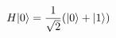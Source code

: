 \documentclass[preview]{standalone}
\begin{document}
\begin{align*}
\special{dvisvgm:raw <g id='unique000'>}H|0\rangle = \frac{1}{\sqrt{2}}(|0\rangle + |1\rangle)\special{dvisvgm:raw </g>}
\end{align*}
\end{document}

